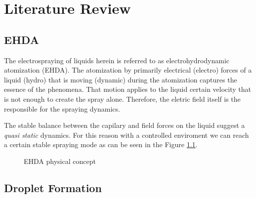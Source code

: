 \chapter{Literature Review}
\label{chap:lit_review}


\section{EHDA}
\label{sec:ehda_resume}

The electrospraying of liquids herein is referred to as electrohydrodynamic atomization (EHDA). The atomization by primarily electrical (electro) forces of a liquid (hydro) that is moving (dynamic) during the atomization captures the essence of the phenomena.\cite{Grace}
That motion applies to the liquid certain velocity that is not enough to create the spray alone. Therefore, the eletric field itself is the responsible for the spraying dynamics.\cite{prunet}

The stable balance between the capilary and field forces on the liquid suggest a \emph{quasi static} dynamics.
For this reason with a controlled enviroment we can reach a certain stable spraying mode as can be seen in the Figure \ref{fig:ehda_setup_ex2}.

\begin{figure}[H]
  \centering
  \caption{EHDA physical concept \cite{Gabriel}}
  \label{fig:ehda_setup_ex2}
\end{figure}


\section{Droplet Formation}
\label{sec:drop_formation}

